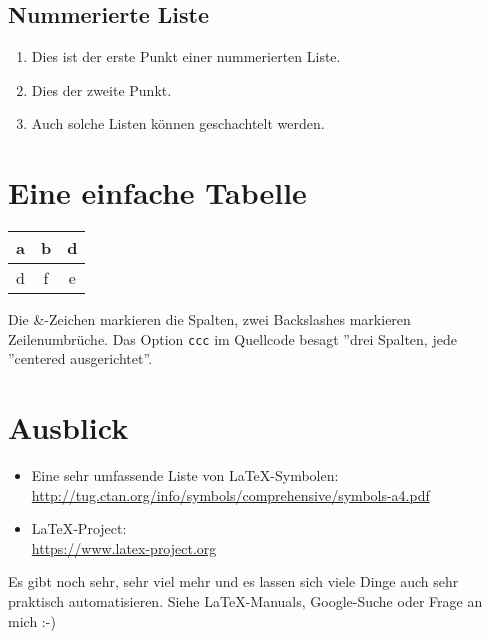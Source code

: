 \subsection{Nummerierte Liste}

\begin{enumerate}
  \item Dies ist der erste Punkt einer nummerierten Liste.
  \item Dies der zweite Punkt.
  \item Auch solche Listen können geschachtelt werden.
\end{enumerate}      


\section{Eine einfache Tabelle}

\begin{center}
  \begin{tabular}{ccc}
    a & b & d  \\ \hline
    d & f & e
  \end{tabular}
\end{center}

Die \&-Zeichen markieren die Spalten, zwei Backslashes markieren Zeilenumbrüche. Das Option \texttt{ccc} im Quellcode besagt ''drei Spalten, jede ''centered ausgerichtet''. 

\section{Ausblick}

\begin{itemize}
  \item Eine sehr umfassende Liste von LaTeX-Symbolen: \\
    \href{http://tug.ctan.org/info/symbols/comprehensive/symbols-a4.pdf}{http://tug.ctan.org/info/symbols/comprehensive/symbols-a4.pdf}
  \item LaTeX-Project: \\
    \href{https://www.latex-project.org}{https://www.latex-project.org}
\end{itemize}  
    
Es gibt noch sehr, sehr viel mehr und es lassen sich viele Dinge auch sehr praktisch automatisieren. Siehe LaTeX-Manuals, Google-Suche oder Frage an mich :-)
